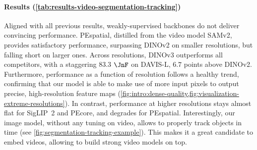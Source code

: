 \paragraph[Results]{Results (\cref{tab:results-video-segmentation-tracking})} 
Aligned with all previous results, weakly-supervised backbones do not deliver convincing performance. 
PEspatial, distilled from the video model SAMv2, provides satisfactory performance, surpassing DINOv2 on smaller resolutions, but falling short on larger ones.
Across resolutions, DINOv3 outperforms all competitors, with a staggering $83.3$ $\JnF$ on DAVIS-L, $6.7$ points above DINOv2.
Furthermore, performance as a function of resolution follows a healthy trend, confirming that our model is able to make use of more input pixels to output precise, high-resolution feature maps (\cf \cref{fig:intro:dense-quality,fig:visualization-extreme-resolutions}).
In contrast, performance at higher resolutions stays almost flat for SigLIP~2 and PEcore, and degrades for PEspatial.
Interestingly, our image model, without any tuning on video, allows to properly track objects in time (see \cref{fig:segmentation-tracking-example}).
This makes it a great candidate to embed videos, allowing to build strong video models on top.

